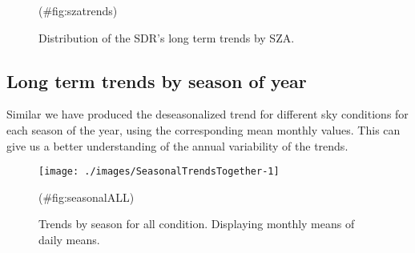 \documentclass[
  preprint, 3p, authoryear]{article}
\begin{document}
\begin{figure}[h!]

{\centering {}

}

\caption{Distribution of the SDR's long term trends by SZA.}(\#fig:szatrends)
\end{figure}

\hypertarget{long-term-trends-by-season-of-year}{%
\subsection{Long term trends by season of year}\label{long-term-trends-by-season-of-year}}

Similar we have produced the deseasonalized trend for different sky conditions for each season of the year, using the corresponding mean monthly values.
This can give us a better understanding of the annual variability of the trends.

\begin{figure}[h!]

{\centering \texttt{[image: ./images/SeasonalTrendsTogether-1]} 

}

\caption{Trends by season for all condition. Displaying monthly means of daily means.}(\#fig:seasonalALL)
\end{figure}
\end{document}
